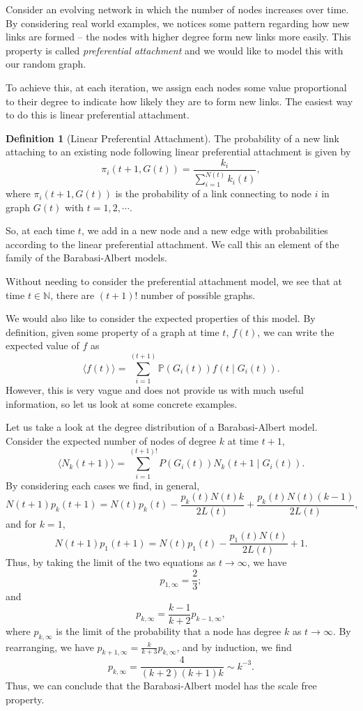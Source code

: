 \documentclass[
]{article}
\theoremstyle{definition}
\newtheorem{definition}{Definition}[section]
\begin{document}
Consider an evolving network in which the number of nodes increases over
time. By considering real world examples, we notices some pattern
regarding how new links are formed -- the nodes with higher degree form
new links more easily. This property is called \emph{preferential
attachment} and we would like to model this with our random graph.

To achieve this, at each iteration, we assign each nodes some value
proportional to their degree to indicate how likely they are to form new
links. The easiest way to do this is linear preferential attachment.

\begin{definition}[Linear Preferential Attachment]
  The probability of a new link attaching to an existing node following 
  linear preferential attachment is given by 
  \[\pi_i (t + 1, G(t)) = \frac{k_i}{\sum_{i = 1}^{N(t)}k_i(t)},\]
  where \(\pi_i(t + 1, G(t))\) is the probability of a link connecting to node 
  \(i\) in graph \(G(t)\) with \(t = 1, 2, \cdots\).
\end{definition}

So, at each time \(t\), we add in a new node and a new edge with
probabilities according to the linear preferential attachment. We call
this an element of the family of the Barabasi-Albert models.

Without needing to consider the preferential attachment model, we see
that at time \(t \in \mathbb{N}\), there are \((t + 1)!\) number of
possible graphs.

We would also like to consider the expected properties of this model. By
definition, given some property of a graph at time \(t\), \(f(t)\), we
can write the expected value of \(f\) as
\[\langle f(t) \rangle = \sum_{i = 1}^{(t + 1)}\mathbb{P}(G_i(t))f(t \mid G_i(t)).\]
However, this is very vague and does not provide us with much useful
information, so let us look at some concrete examples.

Let us take a look at the degree distribution of a Barabasi-Albert
model. Consider the expected number of nodes of degree \(k\) at time
\(t + 1\), \[
\langle N_k(t + 1) \rangle = \sum_{i = 1}^{(t + 1)!} P(G_i(t)) N_k(t + 1 \mid G_i(t)).
\] By considering each cases we find, in general, \[
N(t + 1)p_k(t + 1) = N(t)p_k(t) - \frac{p_k(t)N(t)k}{2L(t)} + \frac{p_k(t)N(t)(k - 1)}{2L(t)},
\] and for \(k = 1\), \[
N(t + 1)p_1(t + 1) = N(t)p_1(t) - \frac{p_1(t)N(t)}{2L(t)} + 1.
\] Thus, by taking the limit of the two equations as \(t \to \infty\),
we have \[p_{1, \infty} = \frac{2}{3};\] and
\[p_{k, \infty} = \frac{k - 1}{k + 2}p_{k - 1, \infty},\] where
\(p_{k, \infty}\) is the limit of the probability that a node has degree
\(k\) as \(t \to \infty\). By rearranging, we have
\(p_{k + 1, \infty} = \frac{k}{k + 3}p_{k, \infty}\), and by induction,
we find \[p_{k, \infty} = \frac{4}{(k + 2)(k + 1)k} \sim k^{-3}.\] Thus,
we can conclude that the Barabasi-Albert model has the scale free
property.
\end{document}

